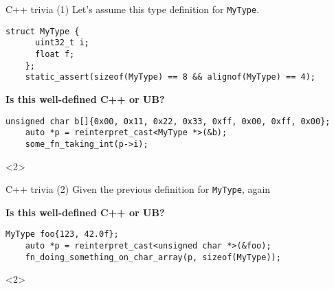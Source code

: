 
\begin{frame}[fragile]{C++ trivia (1)}
  Let's assume this type definition for \texttt{MyType}.
  \begin{lstlisting}[style=c++]
    struct MyType {
      uint32_t i;
      float f;
    };
    static_assert(sizeof(MyType) == 8 && alignof(MyType) == 4);
  \end{lstlisting}
  \vfill

  \textbf{Is this well-defined C++ or UB?}
  \begin{lstlisting}[style=c++]
    unsigned char b[]{0x00, 0x11, 0x22, 0x33, 0xff, 0x00, 0xff, 0x00};
    auto *p = reinterpret_cast<MyType *>(&b);
    some_fn_taking_int(p->i);
  \end{lstlisting}

  \begin{onlyenv}<2>
  \end{onlyenv}
\end{frame}

\begin{frame}[fragile]{C++ trivia (2)}
  Given the previous definition for \texttt{MyType}, again
  \vfill

  \textbf{Is this well-defined C++ or UB?}
  \begin{lstlisting}[style=c++]
    MyType foo{123, 42.0f};
    auto *p = reinterpret_cast<unsigned char *>(&foo);
    fn_doing_something_on_char_array(p, sizeof(MyType));
  \end{lstlisting}

  \begin{onlyenv}<2>
  \end{onlyenv}
\end{frame}

